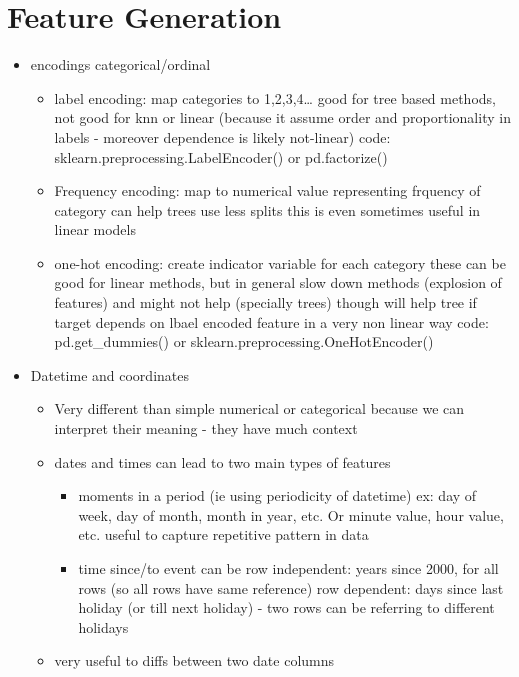 \documentclass[a4paper]{report}
\newcommand{\brown}{\color{brown}}
\begin{document}
\section{Feature Generation}
\begin{itemize}
  \item encodings categorical/ordinal
    \begin{itemize}
      \item label encoding: map categories to 1,2,3,4\ldots
	\subitem good for tree based methods, not good for knn or linear (because it assume order and proportionality in labels - moreover dependence is likely not-linear)
	\subitem code: {\brown sklearn.preprocessing.LabelEncoder()} or {\brown pd.factorize()}
      \item Frequency encoding: map to numerical value representing frquency of category
	\subitem can help trees use less splits
	\subitem this is even sometimes useful in linear models
      \item one-hot encoding: create indicator variable for each category
	\subitem these can be good for linear methods, but in general slow down methods (explosion of features) and might not help (specially trees)
	\subitem though will help tree if target depends on lbael encoded feature in a very non linear way
	\subitem code: {\brown pd.get\_dummies()} or {\brown sklearn.preprocessing.OneHotEncoder()}
    \end{itemize}
  \item Datetime and coordinates
    \begin{itemize}
      \item Very different than simple numerical or categorical because we can interpret their meaning - they have much context
      \item dates and times can lead to two  main types of features
	\begin{itemize}
	  \item moments in a period (ie using periodicity of datetime)
	    \subitem ex: day of week, day of month, month in year, etc.  Or minute value, hour value, etc.
	    \subitem useful to capture repetitive pattern in data
	  \item time since/to event
	    \subitem can be row independent: years since 2000, for all rows (so all rows have same reference)
	    \subitem row dependent: days since last holiday (or till next holiday) - two rows can be referring to different holidays
	\end{itemize}
      \item very useful to diffs between two date columns

\end{itemize}
\end{itemize}
\end{document}
